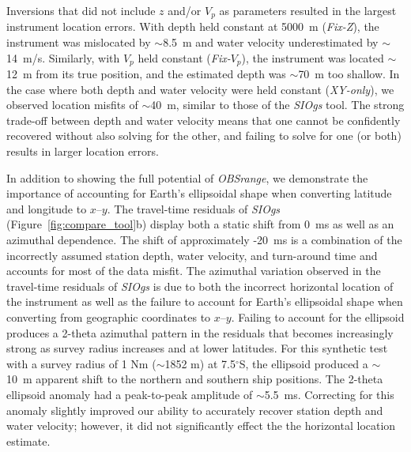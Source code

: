 Inversions that did not include $z$ and/or $V_p$ as parameters resulted in the largest instrument location errors. With depth held constant at 5000~m (\textit{Fix-Z}), the instrument was mislocated by $\sim$8.5~m and water velocity underestimated by $\sim$14~m/s. Similarly, with $V_p$ held constant (\textit{Fix-$V_p$}), the instrument was located $\sim$12~m from its true position, and the estimated depth was $\sim$70~m too shallow. In the case where both depth and water velocity were held constant (\textit{XY-only}), we observed location misfits of $\sim$40~m, similar to those of the \textit{SIOgs} tool. The strong trade-off between depth and water velocity means that one cannot be confidently recovered without also solving for the other, and failing to solve for one (or both) results in larger location errors.


In addition to showing the full potential of \textit{OBSrange}, we demonstrate the importance of accounting for Earth's ellipsoidal shape when converting latitude and longitude to $x$--$y$. The travel-time residuals of \textit{SIOgs} (Figure~\ref{fig:compare_tool}b) display both a static shift from 0~ms as well as an azimuthal dependence. The shift of approximately -20~ms is a combination of the incorrectly assumed station depth, water velocity, and turn-around time and accounts for most of the data misfit. The azimuthal variation observed in the travel-time residuals of \textit{SIOgs} is due to both the incorrect horizontal location of the instrument as well as the failure to account for Earth's ellipsoidal shape when converting from geographic coordinates to $x$--$y$. Failing to account for the ellipsoid produces a 2-theta azimuthal pattern in the residuals that becomes increasingly strong as survey radius increases and at lower latitudes. For this synthetic test with a survey radius of 1 Nm ($\sim$1852 m) at 7.5$^{\circ}$S, the ellipsoid produced a $\sim$10~m apparent shift to the northern and southern ship positions. The 2-theta ellipsoid anomaly had a peak-to-peak amplitude of $\sim$5.5~ms. Correcting for this anomaly slightly improved our ability to accurately recover station depth and water velocity; however, it did not significantly effect the the horizontal location estimate.

